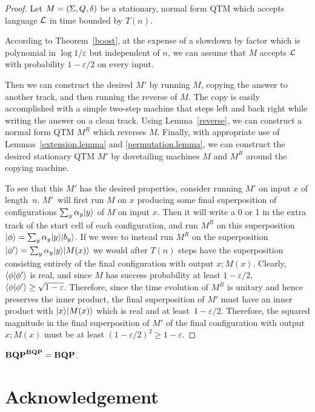\begin{proof}
Let $M = (\Sigma,Q,{\delta})$ be a stationary, normal form QTM which accepts
language ${\cal L}$ in time bounded by $T(n)$.

According to Theorem~\ref{boost}, at the expense of a slowdown by factor
which is polynomial in $\log 1/\varepsilon$ but independent of $n$, we can
assume that $M$ accepts ${\cal L}$ with probability $1 - \varepsilon/2$ on
every input.

Then we can construct the desired $M'$ by running $M$,
copying the answer to another track, and then running the reverse of $M$.
The copy is easily accomplished with a simple two-step machine that steps
left and back right while writing the answer on a clean track.
Using Lemma~\ref{reverse}, we can construct a normal form QTM $M^R$
which reverses $M$.  Finally, with appropriate use
of Lemmas~\ref{extension.lemma} and \ref{permutation.lemma}, we can construct
the desired stationary QTM $M'$ by dovetailing machines $M$ and $M^R$ around
the copying machine.

To see that this $M'$ has the desired properties, consider running $M'$ on
input $x$ of length~$n$.  $M'$~will first run $M$ on $x$ producing some final
superposition of configurations $\sum_y \alpha_y {| y \rangle}$ of $M$ on input $x$.
Then it will write a 0 or 1 in the extra track of the start cell of each
configuration, and run $M^R$ on this superposition
${| \phi \rangle} = \sum_y \alpha_y {| y \rangle}{| b_y \rangle}$.
If we were to instead run $M^R$ on the superposition
${| \phi' \rangle} = \sum_y \alpha_y {| y \rangle}{| M(x) \rangle}$ we would after $T(n)$ steps
have the superposition consisting entirely of the final configuration with
output $x;M(x)$. Clearly, ${\langle \phi | \phi' \rangle}$ is real, and since $M$ has
success probability at least $1 - \varepsilon/2$,
${\langle \phi | \phi' \rangle} \geq \sqrt{1 - \varepsilon}$.
Therefore, since the time evolution of $M^R$ is unitary and hence
preserves the inner product, the final superposition of $M'$ must have
an inner product with ${| x \rangle}{| M(x) \rangle}$ which is real and at
least~$1 - \varepsilon/2$.  Therefore, the squared magnitude in the final
superposition of $M'$ of the final configuration with output~\mbox{$x;M(x)$}
must be at least $(1 - \varepsilon/2)^2 \geq 1 - \varepsilon$.
\end{proof}

\begin{corollary}
$\mbox{\bf BQP}^{\mbox{\scriptsize\bf BQP}} = \mbox{\bf BQP}$.
\end{corollary}

\section*{Acknowledgement}

